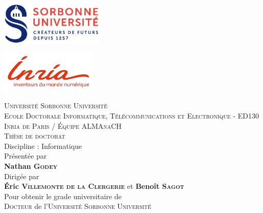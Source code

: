 
\begin{titlepage}

	\begin{center}
		\begin{minipage}[t]{0.4\textwidth}
			\includegraphics[height=2cm]{static/media/sorbonne}
		\end{minipage}%
		\hfill
		\begin{minipage}[t]{0.4\textwidth}
			\hfill
			\includegraphics[height=2cm]{static/media/inria}
		\end{minipage}

		\vspace{0.2cm}
		\LARGE \textsc{Université Sorbonne Université}\\
		\vspace{0.2cm}
		\normalsize \textsc{Ecole Doctorale Informatique, Télécommunications et Electronique} - ED130\\
		\vspace{0.2cm}
		\textsc{Inria de Paris / Équipe ALMAnaCH}\\

		\vspace{0.4cm}
		\Large \textsc{Thèse de doctorat}\\
		\normalsize Discipline : Informatique\\
		\vspace{0.4cm}
		\normalsize Présentée par \\
		\LARGE \textbf{Nathan \textsc{Godey}}\\
		\vspace{0.4cm}
		\normalsize Dirigée par \\
		\Large \textbf{Éric \textsc{Villemonte de la Clergerie}} et \textbf{Benoît \textsc{Sagot}}\\
		\vspace{0.4cm}
		\normalsize Pour obtenir le grade universitaire de\\
		\Large \textsc{Docteur} de l'\textsc{Université Sorbonne Université}


\end{center}
\end{titlepage}
